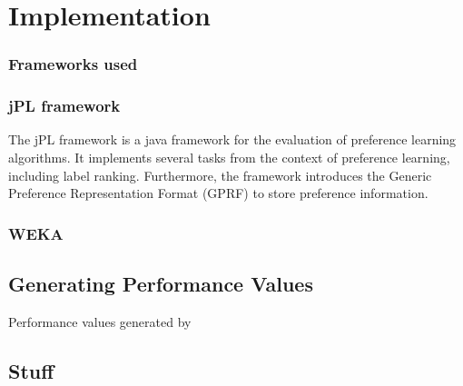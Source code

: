 %
\chapter{Implementation}
\label{sec:implementation}

\subsection{Frameworks used}


\subsection{jPL framework}
The jPL framework is a java framework for the evaluation of preference learning algorithms. It implements several tasks from the context of preference learning, including label ranking. Furthermore, the framework introduces the Generic Preference Representation Format (GPRF) to store preference information.

\subsection{WEKA}


\section{Generating Performance Values}
Performance values generated by 

\section{Stuff}

